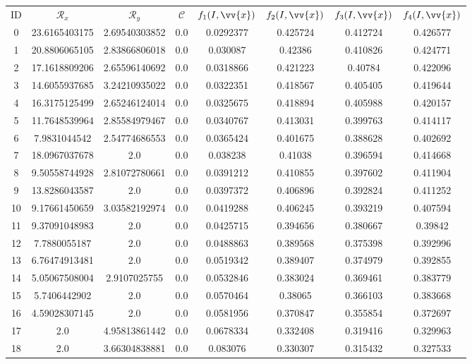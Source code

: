 \scriptsize
\begin{longtable}{|c|c|c|c|c|c|c|c|}
\hline
ID & $\mathscr{R}_x$ & $\mathscr{R}_y$ & $\mathscr{C}$ & $f_1(I,\vv{x})$ & $f_2(I,\vv{x})$ & $f_3(I,\vv{x})$ & $f_4(I,\vv{x})$ \\
0 & 23.6165403175 & 2.69540303852 & 0.0 & 0.0292377 & 0.425724 & 0.412724 & 0.426577 \\
1 & 20.8806065105 & 2.83866806018 & 0.0 & 0.030087 & 0.42386 & 0.410826 & 0.424771 \\
2 & 17.1618809206 & 2.65596140692 & 0.0 & 0.0318866 & 0.421223 & 0.40784 & 0.422096 \\
3 & 14.6055937685 & 3.24210935022 & 0.0 & 0.0322351 & 0.418567 & 0.405405 & 0.419644 \\
4 & 16.3175125499 & 2.65246124014 & 0.0 & 0.0325675 & 0.418894 & 0.405988 & 0.420157 \\
5 & 11.7648539964 & 2.85584979467 & 0.0 & 0.0340767 & 0.413031 & 0.399763 & 0.414117 \\
6 & 7.9831044542 & 2.54774686553 & 0.0 & 0.0365424 & 0.401675 & 0.388628 & 0.402692 \\
7 & 18.0967037678 & 2.0 & 0.0 & 0.038238 & 0.41038 & 0.396594 & 0.414668 \\
8 & 9.50558744928 & 2.81072780661 & 0.0 & 0.0391212 & 0.410855 & 0.397602 & 0.411904 \\
9 & 13.8286043587 & 2.0 & 0.0 & 0.0397372 & 0.406896 & 0.392824 & 0.411252 \\
10 & 9.17661450659 & 3.03582192974 & 0.0 & 0.0419288 & 0.406245 & 0.393219 & 0.407594 \\
11 & 9.37091048983 & 2.0 & 0.0 & 0.0425715 & 0.394656 & 0.380667 & 0.39842 \\
12 & 7.7880055187 & 2.0 & 0.0 & 0.0488863 & 0.389568 & 0.375398 & 0.392996 \\
13 & 6.76474913481 & 2.0 & 0.0 & 0.0519342 & 0.389407 & 0.374979 & 0.392855 \\
14 & 5.05067508004 & 2.9107025755 & 0.0 & 0.0532846 & 0.383024 & 0.369461 & 0.383779 \\
15 & 5.7406442902 & 2.0 & 0.0 & 0.0570464 & 0.38065 & 0.366103 & 0.383668 \\
16 & 4.59028307145 & 2.0 & 0.0 & 0.0581956 & 0.370847 & 0.355854 & 0.372697 \\
17 & 2.0 & 4.95813861442 & 0.0 & 0.0678334 & 0.332408 & 0.319416 & 0.329963 \\
18 & 2.0 & 3.66304838881 & 0.0 & 0.083076 & 0.330307 & 0.315432 & 0.327533 \\

\end{longtable}
